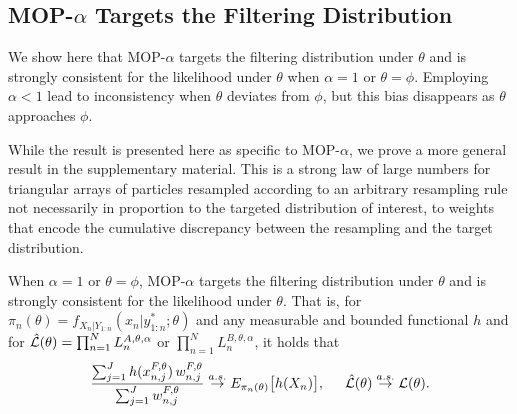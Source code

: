 \documentclass[9pt,twocolumn,pnasresearcharticle]{pnas-new}
\newcommand\arxiv[2]{#2} %
\begin{document}
\arxiv{}{\vspace*{-2mm}}
\subsection{MOP-$\alpha$ Targets the Filtering Distribution}


We show here that MOP-$\alpha$ targets the filtering distribution under $\theta$ and is strongly consistent for the likelihood under $\theta$ when $\alpha=1$ or $\theta=\phi$.
Employing $\alpha<1$ lead to inconsistency when $\theta$ deviates from $\phi$, but this bias disappears as $\theta$ approaches $\phi$.

While the result is presented here as specific to MOP-$\alpha$, we prove a more general result in \arxiv{Appendix~\ref{appendix:targeting}}{the supplementary material}.
This is a strong law of large numbers for triangular arrays of particles resampled according to an arbitrary resampling rule not necessarily in proportion to the targeted distribution of interest, to weights that encode the cumulative discrepancy between the resampling and the target distribution.


\begin{thm}
    \label{thm:mop-targeting}
    When $\alpha=1$ or $\theta=\phi$, MOP-$\alpha$ targets the filtering distribution under $\theta$ and is strongly consistent for the likelihood under $\theta$. That is, for $\pi_n(\theta)=f_{X_{n}|Y_{1:n}}(x_n|y_{1:n}^* ; \theta)$ and any measurable and bounded functional $h$ and for $\hat{\mathcal{L}}(\theta) = \prod_{n=1}^N L_n^{A,\theta,\alpha}$ or $\prod_{n=1}^N L_n^{B,\theta,\alpha}$, it holds that
    \arxiv{}{\vspace*{-1.5mm}}
    \begin{equation} \nonumber
        \frac{\sum_{j=1}^J h(x_{n,j}^{F, \theta}) \, w_{n,j}^{F,\theta}}{\sum_{j=1}^J w_{n,j}^{F,\theta}} \stackrel{a.s.}{\to} E_{\pi_n(\theta)} \big[h(X_n)\big], \hspace{5mm} \hat\lik(\theta)  \stackrel{a.s.}{\to} \lik(\theta).
    \arxiv{}{\vspace*{-1.5mm}}
    \end{equation}
\end{thm}
\end{document}
